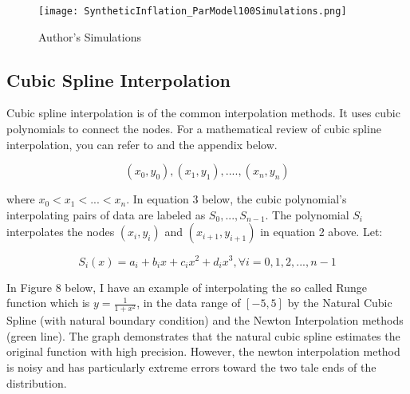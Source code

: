 \documentclass[12pt]{article}
\newcommand{\1}{\mathbbm 1}
\begin{document}
		\begin{figure}[H]
			\begin{Center}
				\texttt{[image: SyntheticInflation\_ParModel100Simulations.png]}
				\caption{Author's Simulations}
			\end{Center}
		\end{figure}
		
		
		
		
		\subsection{Cubic Spline Interpolation}
		
		Cubic spline interpolation is of the common interpolation methods. It uses cubic polynomials to connect the nodes. For a mathematical review of cubic spline interpolation, you can refer to \cite{burden2015numerical} and the appendix below.
		
		\begin{equation}
			(x_{0}, y_{0}), (x_{1}, y_{1}), .... , (x_{n}, y_{n})
		\end{equation}
		
		
		where $x_{0} < x_{1} < ... < x_{n}$. In equation 3 below, the cubic polynomial's interpolating pairs of data are labeled as $S_{0},..., S_{n-1}$. The polynomial $S_{i}$ interpolates the nodes $(x_{i}, y_{i})$ and $(x_{i+1}, y_{i+1})$ in equation 2 above. Let:
		
		
		\begin{equation}
			S_{i}(x) = a_{i} + b_{i}x + c_{i}x^{2} + d_{i}x^{3}, \forall i = 0, 1, 2, ... ,n-1
		\end{equation}
		
		
		
		In Figure 8 below, I have an example of interpolating the so called Runge function which is $y = \frac{1}{1 + x^{2}}$, in the data range of $[-5, 5]$ by the Natural Cubic Spline (with natural boundary condition) and the Newton Interpolation methods (green line). The graph demonstrates that the natural cubic spline estimates the original function with high precision. However, the newton interpolation method is noisy and has particularly extreme errors toward the two tale ends of the distribution.
		
\end{document}
